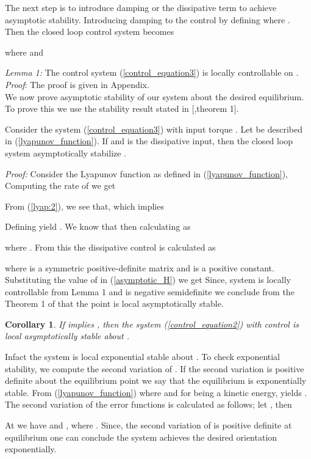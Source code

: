 \documentclass{ifacconf}
\newtheorem{corollary}[thm]{Corollary}
\begin{document}
The next step is to introduce damping or the dissipative term  to achieve asymptotic stability. Introducing damping to the control by defining  
where . Then the closed loop control system becomes 

where  and

\textit{Lemma 1:} The control system (\ref{control_equation3}) is locally controllable on .\\
\textit{Proof}: The proof is given in Appendix.  \\
We now prove asymptotic stability of our system about the desired equilibrium. To prove this we use the stability result stated in [\citep{bullo_stability},theorem 1].
\begin{thm}\label{theorem2}
Consider the system (\ref{control_equation3}) with input torque . Let  be described in (\ref{lyapunov_function}). If  and  is the dissipative input, then the closed loop system asymptotically stabilize .
\end{thm}
\textit{Proof:} Consider the Lyapunov function  as defined in (\ref{lyapunov_function}), Computing the rate of  we get

From (\ref{lyap:2}), we see that,  which implies

Defining  yield . We know that  then calculating  as

where . From this the dissipative control is calculated as

where  is a symmetric positive-definite matrix and  is a positive constant. Substituting the value of  in (\ref{asymptotic_H}) we get 
Since, system is locally controllable from Lemma 1 and  is negative semidefinite we conclude from the Theorem 1 of \citep{bullo_stability} that the point  is local asymptotically stable. \\

\begin{corollary}
 If  implies , then the system (\ref{control_equation2}) with control  is local asymptotically stable about .
\end{corollary}
Infact the system is local exponential stable about
. To check exponential stability, we compute the second variation of . If the second variation is positive definite about the equilibrium point we say that the equilibrium is exponentially stable. From (\ref{lyapunov_function})  where  and for  being a kinetic energy, yields . The second variation of the error functions  is calculated as follows; let , then

At  we have  and , where . Since, the second variation of  is positive definite at equilibrium one can conclude the system achieves the desired orientation exponentially.
\end{document}
